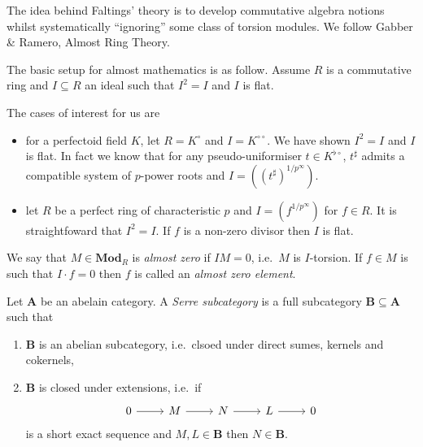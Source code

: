 \documentclass[a4paper]{article}
\newcommand{\tilt}{\flat} %
\renewcommand{\c}[1]{\mathbf{#1}}
\newcommand{\Mod}{{\c{Mod}}}
\begin{document}
The idea behind Faltings' theory is to develop commutative algebra notions whilst systematically ``ignoring'' some class of torsion modules. We follow Gabber \& Ramero, Almost Ring Theory.

The basic setup for almost mathematics is as follow. Assume \(R\) is a commutative ring and \(I \subseteq R\) an ideal such that \(I^2 = I\) and \(I\) is flat.

The cases of interest for us are
\begin{itemize}
\item for a perfectoid field \(K\), let \(R = K^\circ\) and \(I = K^{\circ \circ}\). We have shown \(I^2 = I\) and \(I\) is flat. In fact we know that for any pseudo-uniformiser \(t \in K^{\tilt \circ}\), \(t^\sharp\) admits a compatible system of \(p\)-power roots and \(I = ((t^\sharp)^{1/p^\infty})\).
\item let \(R\) be a perfect ring of characteristic \(p\) and \(I = (f^{1/p^\infty})\) for \(f \in R\). It is straightfoward that \(I^2 = I\). If \(f\) is a non-zero divisor then \(I\) is flat.
\end{itemize}

\begin{definition}
  We say that \(M \in \Mod_R\) is \emph{almost zero} if \(IM = 0\), i.e.\ \(M\) is \(I\)-torsion. If \(f \in M\) is such that \(I \cdot f = 0\) then \(f\) is called an \emph{almost zero element}.
\end{definition}

\begin{definition}
  Let \(\c{A}\) be an abelain category. A \emph{Serre subcategory} is a full subcategory \(\c B \subseteq \c A\) such that
  \begin{enumerate}
  \item \(\c B\) is an abelian subcategory, i.e.\ clsoed under direct sumes, kernels and cokernels,
  \item \(\c B\) is closed under extensions, i.e.\ if
    \[
      \begin{tikzcd}
        0 \ar[r] & M \ar[r] & N \ar[r] & L \ar[r] & 0
      \end{tikzcd}
    \]
    is a short exact sequence and \(M, L \in \c B\) then \(N \in \c B\).
  \end{enumerate}
\end{definition}
\end{document}
